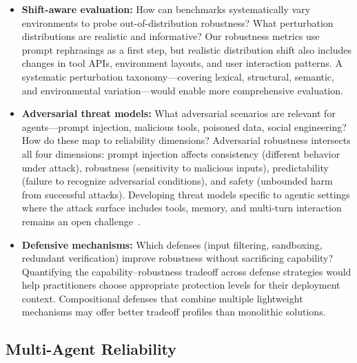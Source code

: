 \documentclass[11pt]{article}
\newcounter{dimension}
\begin{document}
\begin{itemize}[leftmargin=*]
    \item \textbf{Shift-aware evaluation:} How can benchmarks systematically vary environments to probe out-of-distribution robustness?
    What perturbation distributions are realistic and informative?
    Our robustness metrics use prompt rephrasings as a first step, but realistic distribution shift also includes changes in tool APIs, environment layouts, and user interaction patterns.
    A systematic perturbation taxonomy---covering lexical, structural, semantic, and environmental variation---would enable more comprehensive evaluation.

    \item \textbf{Adversarial threat models:} What adversarial scenarios are relevant for agents---prompt injection, malicious tools, poisoned data, social engineering?
    How do these map to reliability dimensions?
    Adversarial robustness intersects all four dimensions: prompt injection affects consistency (different behavior under attack), robustness (sensitivity to malicious inputs), predictability (failure to recognize adversarial conditions), and safety (unbounded harm from successful attacks).
    Developing threat models specific to agentic settings where the attack surface includes tools, memory, and multi-turn interaction remains an open challenge~\citep{foerster2026camels}.

    \item \textbf{Defensive mechanisms:} Which defenses (input filtering, sandboxing, redundant verification) improve robustness without sacrificing capability?
    Quantifying the capability--robustness tradeoff across defense strategies would help practitioners choose appropriate protection levels for their deployment context.
    Compositional defenses that combine multiple lightweight mechanisms may offer better tradeoff profiles than monolithic solutions.
\end{itemize}

\subsection{Multi-Agent Reliability}
\end{document}
